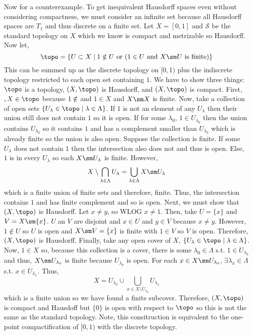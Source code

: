 \documentclass[12pt]{extarticle}
\begin{document}
\begin{enumerate}
Now for a counterexample. To get inequivalent Hausdorff spaces even without considering compactness, we must consider an infinite set because all Hausdorff spaces are $T_1$ and thus discrete on a finite set. Let $X = [0, 1]$ and $\mathcal{S}$ be the standard topology on $X$ which we know is compact and metrizable so Hausdorff. Now let, \[\topo = \{ U \subset X \mid 1 \notin U \text{ or } (1 \in U \text{ and } X \sm U \text{ is finite}) \}\]  This can be summed up as the discrete topology on $[0,1)$ plus the indiscrete topology restricted to each open set containing $1$. We have to show three things: $\topo$ is a topology, $(X, \topo)$ is Hausdorff, and $(X, \topo)$ is compact. First, $\empty, X \in \topo$ because $1 \notin \empty$ and $1 \in X$ and $X \sm X$ is finite. Now, take a collection of open sets $\{U_\lambda \in \topo \mid \lambda \in \Lambda \}$. If $1$ is not an element of any $U_\lambda$ then their union still does not contain $1$ so it is open. If for some $\lambda_0$, $1 \in U_{\lambda_0}$ then the union contains $U_{\lambda_0}$ so it contains $1$ and has a complement smaller than $U_{\lambda_0}$ which is already finite so the union is also open. Suppose the collection is finite. If some $U_\lambda$ does not contain $1$ then the intersection also does not and thus is open. Else, $1$ is in every $U_\lambda$ so each $X \sm U_\lambda$ is finite. However, \[X \setminus \bigcap_{\lambda \in \Lambda} U_\lambda = \bigcup_{\lambda \in \Lambda} X \sm U_\lambda \]
which is a finite union of finite sets and therefore, finite. Thus, the intersection contains $1$ and has finite complement and so is open. Next, we must show that $(X, \topo)$ is Hausdorff. Let $x \neq y$, so WLOG $x \neq 1$. Then, take $U = \{x \}$ and $V = X \sm \{x \}$. $U$ an $V$ are disjoint and $x \in U$ and $y \in V$ because $x \neq y$. However, $1 \notin U$ so $U$ is open and $X \sm V = \{x \}$ is finite with $1 \in V$ so $V$ is open. Therefore, $(X, \topo)$ is Hausdorff. Finally, take any open cover of $X$, $\{U_\lambda \in \topo \mid \lambda \in \Lambda \}$. Now, $1 \in X$ so, because this collection is a cover, there is some $\lambda_0 \in \Lambda$ s.t. $1 \in U_{\lambda_0}$ and thus, $X \sm U_{\lambda_0}$ is finite because $U_{\lambda_0}$ is open. For each $x \in X \sm U_{\lambda_0}$, $\exists \lambda_x \in \Lambda$ s.t. $x \in U_{\lambda_x}$. Thus, \[X = U_{\lambda_0} \cup \bigcup\limits_{x \in X \setminus U_{\lambda_0}} U_{\lambda_x}\]  
which is a finite union so we have found a finite subcover. Therefore, $(X, \topo)$ is compact and Hausdoff but $\{0\}$ is open with respect to $\topo$ so this is not the same as the standard topology. Note, this consitruction is equivalent to the one-point compactification of $[0,1)$ with the discrete topology. 
\end{enumerate}
\end{document}
